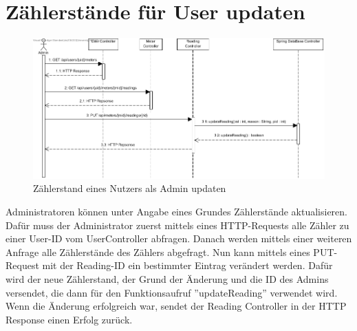 \section{Zählerstände für User updaten}
\begin{figure}[H]
	\centering
	\includegraphics[width = 15cm]{img/diagrams/ChangeReading}
	\caption{Zählerstand eines Nutzers als Admin updaten}
\end{figure}
Administratoren können unter Angabe eines Grundes Zählerstände aktualisieren.
Dafür muss der Administrator zuerst mittels eines HTTP-Requests alle Zähler  zu einer User-ID vom UserController abfragen. Danach werden mittels einer weiteren Anfrage alle Zählerstände des Zählers abgefragt. Nun kann mittels eines PUT-Request mit der Reading-ID ein bestimmter Eintrag verändert werden. Dafür wird der neue Zählerstand, der Grund der Änderung und die ID des Admins versendet, die dann für den Funktionsaufruf ''updateReading'' verwendet wird. Wenn die Änderung erfolgreich war, sendet der Reading Controller in der HTTP Response einen Erfolg zurück.